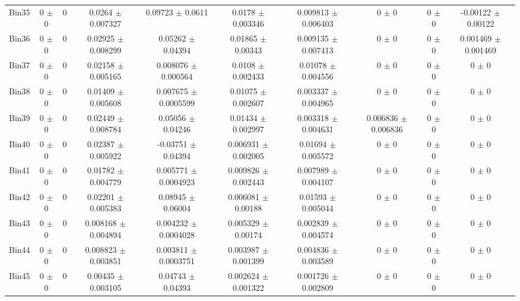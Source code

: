 \begin{tabular}{@{\extracolsep{4pt}}lccccccccc@{}}
     Bin35 & 0 $\pm$ 0 & 0 & 0.0264 $\pm$ 0.007327 & 0.09723 $\pm$ 0.0611 & 0.0178 $\pm$ 0.003346 & 0.009813 $\pm$ 0.006403 & 0 $\pm$ 0 & 0 $\pm$ 0 & -0.00122 $\pm$ 0.00122 \\ 
     Bin36 & 0 $\pm$ 0 & 0 & 0.02925 $\pm$ 0.008299 & 0.05262 $\pm$ 0.04394 & 0.01865 $\pm$ 0.00343 & 0.009135 $\pm$ 0.007413 & 0 $\pm$ 0 & 0 $\pm$ 0 & 0.001469 $\pm$ 0.001469 \\ 
     Bin37 & 0 $\pm$ 0 & 0 & 0.02158 $\pm$ 0.005165 & 0.008076 $\pm$ 0.000564 & 0.0108 $\pm$ 0.002433 & 0.01078 $\pm$ 0.004556 & 0 $\pm$ 0 & 0 $\pm$ 0 & 0 $\pm$ 0 \\ 
     Bin38 & 0 $\pm$ 0 & 0 & 0.01409 $\pm$ 0.005608 & 0.007675 $\pm$ 0.0005599 & 0.01075 $\pm$ 0.002607 & 0.003337 $\pm$ 0.004965 & 0 $\pm$ 0 & 0 $\pm$ 0 & 0 $\pm$ 0 \\ 
     Bin39 & 0 $\pm$ 0 & 0 & 0.02449 $\pm$ 0.008784 & 0.05056 $\pm$ 0.04246 & 0.01434 $\pm$ 0.002997 & 0.003318 $\pm$ 0.004631 & 0.006836 $\pm$ 0.006836 & 0 $\pm$ 0 & 0 $\pm$ 0 \\ 
     Bin40 & 0 $\pm$ 0 & 0 & 0.02387 $\pm$ 0.005922 & -0.03751 $\pm$ 0.04394 & 0.006931 $\pm$ 0.002005 & 0.01694 $\pm$ 0.005572 & 0 $\pm$ 0 & 0 $\pm$ 0 & 0 $\pm$ 0 \\ 
     Bin41 & 0 $\pm$ 0 & 0 & 0.01782 $\pm$ 0.004779 & 0.005771 $\pm$ 0.0004923 & 0.009826 $\pm$ 0.002443 & 0.007989 $\pm$ 0.004107 & 0 $\pm$ 0 & 0 $\pm$ 0 & 0 $\pm$ 0 \\ 
     Bin42 & 0 $\pm$ 0 & 0 & 0.02201 $\pm$ 0.005383 & 0.08945 $\pm$ 0.06004 & 0.006081 $\pm$ 0.00188 & 0.01593 $\pm$ 0.005044 & 0 $\pm$ 0 & 0 $\pm$ 0 & 0 $\pm$ 0 \\ 
     Bin43 & 0 $\pm$ 0 & 0 & 0.008168 $\pm$ 0.004894 & 0.004232 $\pm$ 0.0004028 & 0.005329 $\pm$ 0.00174 & 0.002839 $\pm$ 0.004574 & 0 $\pm$ 0 & 0 $\pm$ 0 & 0 $\pm$ 0 \\ 
     Bin44 & 0 $\pm$ 0 & 0 & 0.008823 $\pm$ 0.003851 & 0.003811 $\pm$ 0.0003751 & 0.003987 $\pm$ 0.001399 & 0.004836 $\pm$ 0.003589 & 0 $\pm$ 0 & 0 $\pm$ 0 & 0 $\pm$ 0 \\ 
     Bin45 & 0 $\pm$ 0 & 0 & 0.00435 $\pm$ 0.003105 & 0.04743 $\pm$ 0.04393 & 0.002624 $\pm$ 0.001322 & 0.001726 $\pm$ 0.002809 & 0 $\pm$ 0 & 0 $\pm$ 0 & 0 $\pm$ 0 \\ 
\hline\hline
  \end{tabular}
